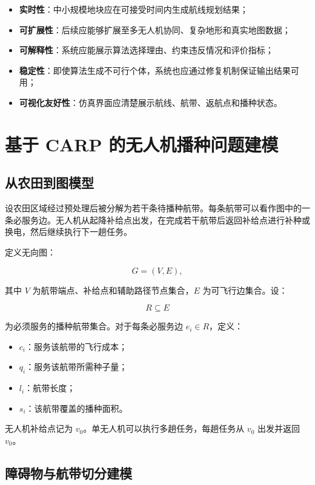 \documentclass[UTF8,a4paper,12pt]{ctexart}
\begin{document}
\begin{itemize}
    \item \textbf{实时性}：中小规模地块应在可接受时间内生成航线规划结果；
    \item \textbf{可扩展性}：后续应能够扩展至多无人机协同、复杂地形和真实地图数据；
    \item \textbf{可解释性}：系统应能展示算法选择理由、约束违反情况和评价指标；
    \item \textbf{稳定性}：即使算法生成不可行个体，系统也应通过修复机制保证输出结果可用；
    \item \textbf{可视化友好性}：仿真界面应清楚展示航线、航带、返航点和播种状态。
\end{itemize}

\section{基于 CARP 的无人机播种问题建模}

\subsection{从农田到图模型}

设农田区域经过预处理后被分解为若干条待播种航带。每条航带可以看作图中的一条必服务边。无人机从起降补给点出发，在完成若干航带后返回补给点进行补种或换电，然后继续执行下一趟任务。

定义无向图：

\[
G=(V,E),
\]

其中 \(V\) 为航带端点、补给点和辅助路径节点集合，\(E\) 为可飞行边集合。设：

\[
R \subseteq E
\]

为必须服务的播种航带集合。对于每条必服务边 \(e_i \in R\)，定义：

\begin{itemize}
    \item \(c_i\)：服务该航带的飞行成本；
    \item \(q_i\)：服务该航带所需种子量；
    \item \(l_i\)：航带长度；
    \item \(s_i\)：该航带覆盖的播种面积。
\end{itemize}

无人机补给点记为 \(v_0\)。单无人机可以执行多趟任务，每趟任务从 \(v_0\) 出发并返回 \(v_0\)。

\subsection{障碍物与航带切分建模}
\end{document}

